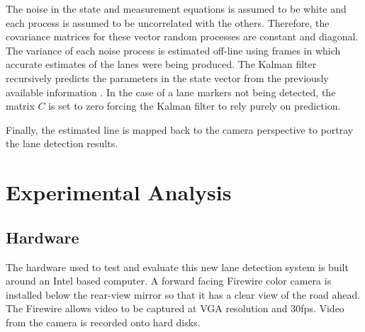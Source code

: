 \documentclass{article}
\begin{document}
The noise in the state and measurement equations is assumed to be white
and each process is assumed to be uncorrelated with the others.
Therefore, the covariance matrices for these vector random processes are
constant and diagonal. The variance of each noise process is estimated
 off-line using frames in which accurate estimates
of the lanes were being produced.
The Kalman filter recursively predicts the parameters in the state vector from the previously available information \cite{hayes_statistical_1996,brookner_tracking_1998}.
In the case of a lane markers not being detected, the matrix $C$ is set to zero
forcing the Kalman filter to rely purely on prediction.

Finally, the estimated line is mapped back to the camera perspective to portray the lane detection results.

\section{Experimental Analysis}
\label{sec:exp_ana}
\subsection{Hardware}
The hardware used to test and evaluate this new lane detection system is built around an Intel based computer.  A forward facing Firewire color camera is installed below the rear-view mirror so that it has a clear view of the road ahead. The Firewire allows video to be captured at VGA resolution and 30fps.
Video from the camera is recorded onto hard disks.
\end{document}
